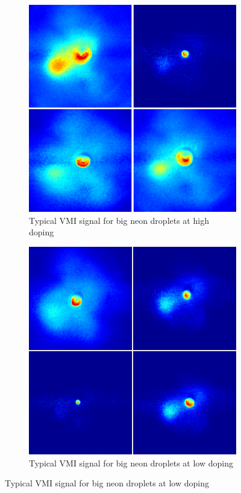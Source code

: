 \begin{figure}[h!]
\hfill
\begin{subfigure}[l]{0.4\textwidth}
\caption{Typical VMI signal for big neon droplets at high doping}
\includegraphics[width=1\textwidth]{../Images/results/MIR_Ne_XeDop_39K/RAw_NE_37KHighdop.png} 
\end{subfigure} 
\begin{subfigure}[l]{0.4\textwidth}
\caption{Typical VMI signal for big neon droplets at low doping}
\includegraphics[width=1\textwidth]{../Images/results/MIR_Ne_XeDop_39K/RAw_NE_37Klowdop.png} 
\end{subfigure} \hfill



\end{figure}
